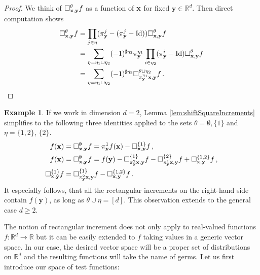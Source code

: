 \documentclass[12pt]{article}
\numberwithin{equation}{section}
\theoremstyle{plain}
\theoremstyle{definition}
\newtheorem{definition}[theorem]{Definition}
\newtheorem{example}[theorem]{Example}
\newcommand{\abs}[1]{\left\vert #1 \right\vert}
\newcommand{\norm}[1]{\left\Vert #1\right\Vert}
\newcommand{\R}{\ensuremath{{\mathbb R}}}
\def\bR{\mathbb{R}}\def\bS{\mathbb{S}}
\def\fk{\mathbf k}\def\fl{\mathbf l}
\def\fy{\mathbf y}\def\fz{\mathbf z}
\def\supp{\mbox{supp}}
\begin{document}
\begin{proof} We think of $\square^\theta_{\fx,\fy} f$ as a function of $\mathbf x$ for fixed $\fy\in\bR^d$. Then direct computation shows
    \begin{align*}
        \square_{\fx,\fy}^\theta f &= \prod_{j\in\eta}(\pi_\fy^j-(\pi_\fy^j- \text{Id}))\square_{\fx,\fy}^\theta f\\
        &= \sum_{\eta = \eta_1\sqcup \eta_2}(-1)^{\sharp{\eta_2}}\pi_\fy^{\eta_1}\prod_{i\in\eta_2}(\pi^i_\fy-\text{Id})\square_{\fx,\fy}^{\theta}f\\
        &= \sum_{\eta = \eta_1\sqcup\eta_2} (-1)^{\sharp{\eta_2}} \square^{\theta\cup\eta_2}_{\pi^{\eta_1}_\fy \fx, \fy}f\,.
    \end{align*}
\end{proof}

\begin{example}
    If we work in dimension $d=2$, Lemma \ref{lem:shiftSquareIncrements} simplifies to the following three identities applied to the sets $\theta=\emptyset, \{1\}$ and $\eta= \{1,2\}$, $\{2\}$.
 \begin{align*}
 f(\fx) &=\square_{\fx,\fy}^\emptyset f=  \pi^1_{\fy} f(\fx) - \square^{\{1\}}_{\fx,\fy} f \,, \\ f(\fx) &=\square_{\fx,\fy}^\emptyset f= f(\fy) -\square^{\{1\}}_{\pi^2_\fy\fx,\fy} f - \square^{\{2\}}_{\pi^1_\fy\fx,\fy}f + \square^{\{1,2\}}_{\fx,\fy}f\,,\\
        \square^{\{1\}}_{\fx,\fy} f &= \square^{\{1\}}_{\pi_\fy^2 \fx,\fy} f - \square^{\{1,2\}}_{\fx,\fy} f\,.
\end{align*}
    It especially follows, that all the rectangular increments on the right-hand side contain $f(\fy)$, as long as $\theta\cup\eta = [d]$. This observation extends to the general case $d\ge 2$.
\end{example}


The notion of rectangular increment does not only apply to real-valued functions $f\colon \R^d\to \R$ but it can be easily extended to $f$ taking values in a generic vector space. In our case, the desired vector space will be a proper set of distributions on $\R^d$ and the resulting functions will take the name of germs. Let us first introduce our space of test functions:

\end{document}

